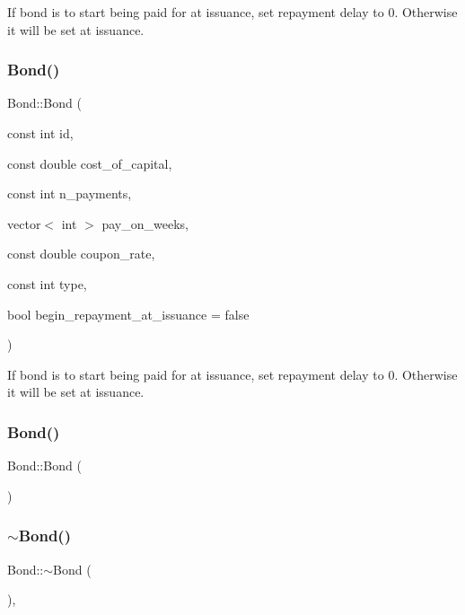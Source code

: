 If bond is to start being paid for at issuance, set repayment delay to 0. Otherwise it will be set at issuance. \mbox{\label{classBond_a8758b7ef325a779eeee87eb91947ce58_a8758b7ef325a779eeee87eb91947ce58}} 
\subsubsection{\texorpdfstring{Bond()}{Bond()}\hspace{0.1cm}{\footnotesize\ttfamily [2/4]}}
{\footnotesize\ttfamily Bond\+::\+Bond (\begin{DoxyParamCaption}\item[{const int}]{id,  }\item[{const double}]{cost\+\_\+of\+\_\+capital,  }\item[{const int}]{n\+\_\+payments,  }\item[{vector$<$ int $>$}]{pay\+\_\+on\+\_\+weeks,  }\item[{const double}]{coupon\+\_\+rate,  }\item[{const int}]{type,  }\item[{bool}]{begin\+\_\+repayment\+\_\+at\+\_\+issuance = {\ttfamily false} }\end{DoxyParamCaption})}

If bond is to start being paid for at issuance, set repayment delay to 0. Otherwise it will be set at issuance. \mbox{\label{classBond_a5b809c10637a30a2b24ed01609d68711_a5b809c10637a30a2b24ed01609d68711}} 
\subsubsection{\texorpdfstring{Bond()}{Bond()}\hspace{0.1cm}{\footnotesize\ttfamily [3/4]}}
{\footnotesize\ttfamily Bond\+::\+Bond (\begin{DoxyParamCaption}{ }\end{DoxyParamCaption})}

\mbox{\label{classBond_a6072f41bd412cb66b4fb13833a14d0ec_a6072f41bd412cb66b4fb13833a14d0ec}} 
\subsubsection{\texorpdfstring{$\sim$\+Bond()}{~Bond()}}
{\footnotesize\ttfamily Bond\+::$\sim$\+Bond (\begin{DoxyParamCaption}{ }\end{DoxyParamCaption})\hspace{0.3cm}{\ttfamily [virtual]}, {\ttfamily [default]}}

